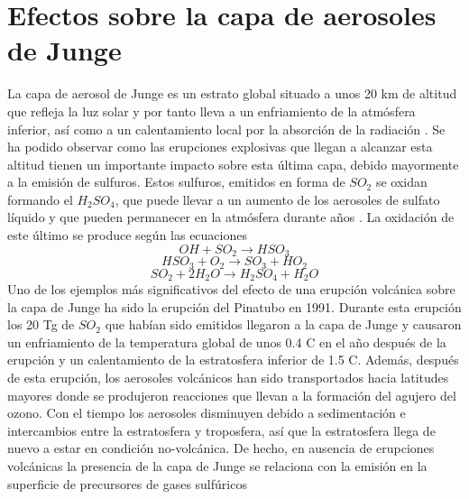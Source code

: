 \documentclass[a4apaper,twocolumn,10pt]{article}
\begin{document}
\section{Efectos sobre la capa de aerosoles de Junge}
La capa de aerosol de Junge es un estrato global situado a unos 20 km de altitud que refleja la luz solar y por tanto lleva a un enfriamiento de la atm\'osfera inferior, as\'i como a un calentamiento local por la absorci\'on de la radiaci\'on \cite{von2009effects}. Se ha podido observar como las erupciones explosivas que llegan a alcanzar esta altitud tienen un importante impacto sobre esta \'ultima capa, debido mayormente a la emisi\'on de sulfuros. Estos sulfuros, emitidos en forma de $SO_{2}$ se oxidan formando el $H_{2}SO_{4}$, que puede llevar a un aumento de los aerosoles de sulfato l\'iquido y que pueden permanecer en la atmósfera durante años
\cite{vernier2011major}. La oxidaci\'on de este \'ultimo se produce seg\'un las ecuaciones 
\begin{displaymath}
OH+SO_{2}\rightarrow HSO_{3}
\end{displaymath}
\begin{displaymath}
HSO_{3}+O_{2}\rightarrow SO_{3}+HO_{2}
\end{displaymath}
\begin{displaymath}
SO_{2}+2H_{2}O\rightarrow H_{2}SO_{4}+H_{2}O
\end{displaymath}
Uno de los ejemplos más significativos del efecto de una erupción volcánica sobre la
capa de Junge ha sido la erupción del Pinatubo en 1991. Durante esta erupci\'on los 20 Tg de $SO_{2}$ que habían sido emitidos llegaron a la capa de Junge y causaron un enfriamiento de la
temperatura global de unos 0.4 \textdegree C en el a\~no después de la erupción y un calentamiento de la estratosfera inferior de 1.5 \textdegree C. Además, después de esta erupción, los aerosoles volcánicos han sido transportados hacia latitudes mayores donde se produjeron reacciones que llevan a la formación del agujero del ozono. Con el tiempo los aerosoles disminuyen debido a
sedimentación e intercambios entre la estratosfera y troposfera, así que la estratosfera llega de
nuevo a estar en condición no-volcánica. De hecho, en ausencia de erupciones volcánicas la
presencia de la capa de Junge se relaciona con la emisión en la superficie de precursores de
gases sulfúricos
\end{document}
